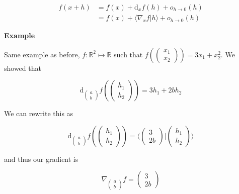 \documentclass{tufte-handout}
\newcommand{\ud}{\mathrm{d}}
\begin{document}

\begin{align}
f(x + h) &= f(x) + \ud_x f (h) + o_{h \rightarrow 0}(h)\\
&= f(x) + \langle \nabla_x f | h \rangle  + o_{h \rightarrow 0}(h)
\end{align}
\label{eq:grad}

\textbf{Example}
\label{example:gradient}

Same example as before, $ f : \mathbb{R}^2 \mapsto \mathbb{R} $ such that $ f(\begin{pmatrix}
x_1 \\
x_2
\end{pmatrix}) = 3x_1 + x_2^2 $. We showed that 

$$ \ud_{\begin{pmatrix}
a \\
b
\end{pmatrix}}f (\begin{pmatrix}
h_1\\
h_2
\end{pmatrix}) =  3 h_1 + 2 b h_2 $$

We can rewrite this as 

$$ \ud_{\begin{pmatrix}
a \\
b
\end{pmatrix}}f (\begin{pmatrix}
h_1\\
h_2
\end{pmatrix}) =   \langle \begin{pmatrix}
3\\
2b
\end{pmatrix} | \begin{pmatrix}
h_1 \\
h_2
\end{pmatrix} \rangle  $$

and thus our gradient is 

$$ \nabla_{\begin{pmatrix}
a \\
b
\end{pmatrix}}f = \begin{pmatrix}
3 \\ 
2b
\end{pmatrix} $$
\end{document}
